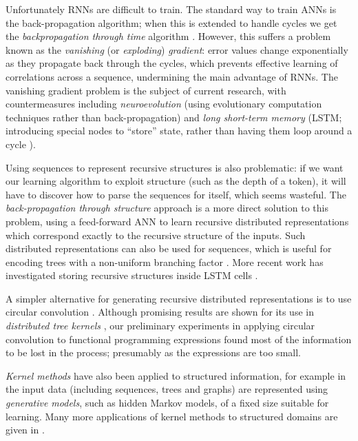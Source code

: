 Unfortunately RNNs are difficult to train. The standard way to train ANNs is the back-propagation algorithm; when this is extended to handle cycles we get the \emph{backpropagation through time} algorithm \citep{werbos1990backpropagation}. However, this suffers a problem known as the \emph{vanishing} (or \emph{exploding}) \emph{gradient}: error values change exponentially as they propagate back through the cycles, which prevents effective learning of correlations across a sequence, undermining the main advantage of RNNs. The vanishing gradient problem is the subject of current research, with countermeasures including \emph{neuroevolution} (using evolutionary computation techniques rather than back-propagation) and \emph{long short-term memory} (LSTM; introducing special nodes to ``store'' state, rather than having them loop around a cycle \citep{hochreiter1997long}).

Using sequences to represent recursive structures is also problematic: if we want our learning algorithm to exploit structure (such as the depth of a token), it will have to discover how to parse the sequences for itself, which seems wasteful. The \emph{back-propagation through structure} approach \citep{goller1996learning} is a more direct solution to this problem, using a feed-forward ANN to learn recursive distributed representations \citep{pollack1990recursive} which correspond exactly to the recursive structure of the inputs. Such distributed representations can also be used for sequences, which is useful for encoding trees with a non-uniform branching factor \citep{kwasny1995tail}. More recent work has investigated storing recursive structures inside LSTM cells \citep{zhu2015long}.

A simpler alternative for generating recursive distributed representations is to use circular convolution \citep{conf/ijcai/Plate91}. Although promising results are shown for its use in \emph{distributed tree kernels} \citep{zanzotto2012distributed}, our preliminary experiments in applying circular convolution to functional programming expressions found most of the information to be lost in the process; presumably as the expressions are too small.

\emph{Kernel methods} have also been applied to structured information, for example in \citep{Gartner2003} the input data (including sequences, trees and graphs) are represented using \emph{generative models}, such as hidden Markov models, of a fixed size suitable for learning. Many more applications of kernel methods to structured domains are given in \citep{bakir2007predicting}.
